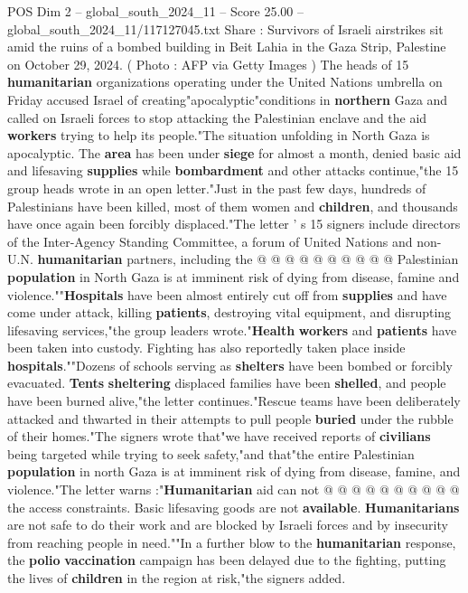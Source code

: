 \begin{textsample}{POS Dim 2 – global\_south\_2024\_11 – Score 25.00 – global\_south\_2024\_11/117127045.txt}  \label{ex:f2_pos_248}
Share : Survivors of Israeli airstrikes sit amid the ruins of a bombed building in Beit Lahia in the Gaza Strip, Palestine on October 29, 2024. ( Photo : AFP via Getty Images ) The heads of 15 \textbf{humanitarian} organizations operating under the United Nations umbrella on Friday accused Israel of creating"apocalyptic"conditions in \textbf{northern} Gaza and called on Israeli forces to stop attacking the Palestinian enclave and the aid \textbf{workers} trying to help its people."The situation unfolding in North Gaza is apocalyptic.
The \textbf{area} has been under \textbf{siege} for almost a month, denied basic aid and lifesaving \textbf{supplies} while \textbf{bombardment} and other attacks continue,"the 15 group heads wrote in an open letter."Just in the past few days, hundreds of Palestinians have been killed, most of them women and \textbf{children}, and thousands have once again been forcibly displaced."The letter ' s 15 signers include directors of the Inter-Agency Standing Committee, a forum of United Nations and non-U.N. \textbf{humanitarian} partners, including the @ @ @ @ @ @ @ @ @ @ Palestinian \textbf{population} in North Gaza is at imminent risk of dying from disease, famine and violence.""\textbf{Hospitals} have been almost entirely cut off from \textbf{supplies} and have come under attack, killing \textbf{patients}, destroying vital equipment, and disrupting lifesaving services,"the group leaders wrote."\textbf{Health} \textbf{workers} and \textbf{patients} have been taken into custody.
Fighting has also reportedly taken place inside \textbf{hospitals}.""Dozens of schools serving as \textbf{shelters} have been bombed or forcibly evacuated. \textbf{Tents} \textbf{sheltering} displaced families have been \textbf{shelled}, and people have been burned alive,"the letter continues."Rescue teams have been deliberately attacked and thwarted in their attempts to pull people \textbf{buried} under the rubble of their homes."The signers wrote that"we have received reports of \textbf{civilians} being targeted while trying to seek safety,"and that"the entire Palestinian \textbf{population} in north Gaza is at imminent risk of dying from disease, famine, and violence."The letter warns :"\textbf{Humanitarian} aid can not @ @ @ @ @ @ @ @ @ @ the access constraints.
Basic lifesaving goods are not \textbf{available}. \textbf{Humanitarians} are not safe to do their work and are blocked by Israeli forces and by insecurity from reaching people in need.""In a further blow to the \textbf{humanitarian} response, the \textbf{polio} \textbf{vaccination} campaign has been delayed due to the fighting, putting the lives of \textbf{children} in the region at risk,"the signers added.

\end{textsample}
